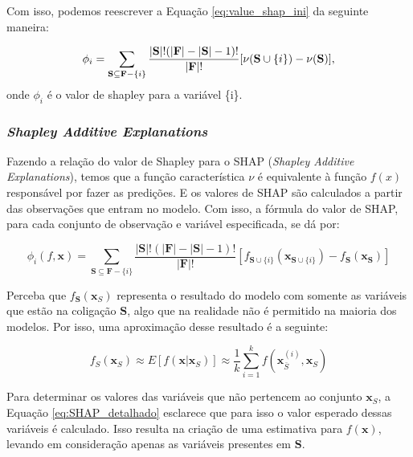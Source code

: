 Com isso, podemos reescrever a Equação \ref{eq:value_shap_ini} da seguinte maneira:

\[
\phi_i= 
\sum_{\textbf{S} \subseteq  \textbf{F} - \{i\}}
\frac{|\textbf{S}|!(|\textbf{F}| - |\textbf{S}| - 1)!}{|\textbf{F}|!}
[\nu(\textbf{S}\cup\{i\}) - \nu(\textbf{\textbf{S}})],
\]
\noindent\hspace{1.5cm} onde $\phi_i$ é o valor de shapley para a variável \{i\}.

\subsubsection{\textit{Shapley Additive Explanations}}

Fazendo a relação do valor de Shapley para o SHAP (\textit{Shapley Additive Explanations}), 
temos que a função característica $\nu$ é equivalente à função $f(x)$ responsável por fazer as predições.
 E os valores de SHAP são calculados a partir das observações que entram no modelo. Com isso, a fórmula do valor
  de SHAP, para cada conjunto de observação e variável especificada, se dá por:

\begin{equation}
\phi_i(f,\textbf{x})= 
\sum_{\textbf{S} \subseteq  \textbf{F} - \{i\}}
\frac{|\textbf{S}|!(|\textbf{F}| - |\textbf{S}| - 1)!}{|\textbf{F}|!}
[f_{\textbf{S}\cup\{i\}}(\textbf{x}_{\textbf{S}\cup\{i\}}) - f_{\textbf{S}}(\textbf{x}_{\textbf{S}})
]
\label{eq:SHAP}
\end{equation}

Perceba que $f_\textbf{S}(\textbf{x}_S)$ representa o resultado do modelo com somente as variáveis que estão na coligação $\textbf{S}$, algo que na realidade não é permitido na maioria dos modelos. Por isso, uma aproximação desse resultado é a seguinte:

\begin{equation}    
f_S(\textbf{x}_S) \approx E[f(\textbf{x}|\textbf{x}_S)] \approx 
\frac{1}{k} \sum_{i=1}^{k}
f(\textbf{x}_{\bar{S}}^{(i)}, \textbf{x}_S)
\label{eq:SHAP_detalhado}
\end{equation}

Para determinar os valores das variáveis que não pertencem ao conjunto $\textbf{x}_S$, a Equação
\ref{eq:SHAP_detalhado} esclarece que para isso o valor esperado dessas variáveis é calculado. Isso resulta na criação de uma
estimativa para $f(\textbf{x})$, levando em consideração apenas as variáveis presentes em $\textbf{S}$.


